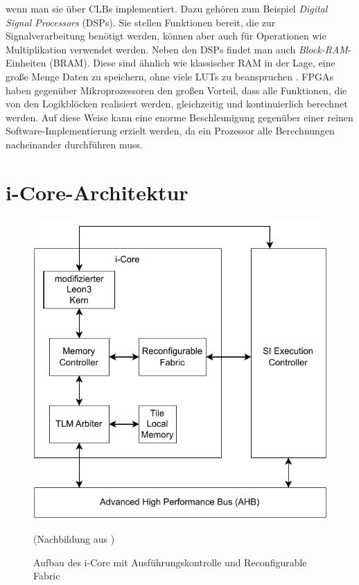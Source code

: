 wenn man sie über CLBs implementiert. Dazu gehören zum Beispiel \textit{Digital Signal Processors} (DSPs).
Sie stellen Funktionen bereit, die zur Signalverarbeitung benötigt werden, können aber auch für Operationen wie Multiplikation verwendet werden.
Neben den DSPs findet man auch \textit{Block-RAM}-Einheiten (BRAM). Diese sind ähnlich wie klassischer RAM in der Lage, eine große Menge Daten zu speichern,
ohne viele LUTs zu beanspruchen \cite{fpga-basics}. FPGAs haben gegenüber Mikroprozessoren den großen Vorteil, dass alle Funktionen, die von den Logikblöcken
realisiert werden, gleichzeitig und kontinuierlich berechnet werden. Auf diese Weise kann eine enorme Beschleunigung gegenüber einer
reinen Software-Implementierung erzielt werden, da ein Prozessor alle Berechnungen nacheinander durchführen muss.

\section{i-Core-Architektur}
\begin{figure}
    \center
    \includegraphics{images/Icore_Arch.pdf}
    \caption{Aufbau des i-Core mit Ausführungskontrolle und Reconfigurable Fabric}
	(Nachbildung aus \cite{hering2020})
    \label{fig:icore_arch}
\end{figure}
\label{sec:icore_arch}
